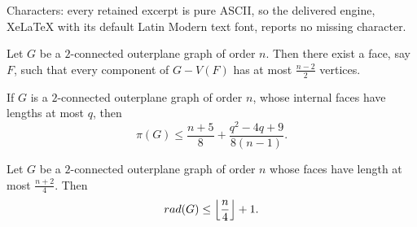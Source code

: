 \documentclass[10pt,a4paper]{amsart}
\begin{document}
Characters: every retained excerpt is pure ASCII, so the delivered engine, XeLaTeX with its default Latin Modern text font, reports no missing character.
\begin{lemma}
\label{lemm:face-component-has-at-most-n-2/2 vertices}
Let $G$ be a $2$-connected outerplane graph of order $n$. Then there exist a face, say $F$, such that every component of $G - V(F)$ has at most $\frac{n-2}{2}$ vertices.
\end{lemma}

\begin{theorem}\label{theo:proximity in 2-connected outerplana graph}
If $G$ is a $2$-connected outerplane graph of order $n$, whose internal faces have lengths at most $q$, then 
\begin{equation*} \label{eq:pi(G) in terms of q,n}
\pi(G) \leq
   \dfrac{n+5}{8}+\dfrac{q^2-4q+9}{8(n-1)}.
\end{equation*}
\end{theorem}

\begin{theorem}\label{theo:rad in Outerpanar}
Let $G$ be a $2$-connected outerplane graph of order $n$ whose faces have length at most 
$\frac{n+2}{4}$. 
Then
\[ {\rm rad}(G) \leq \left\lfloor \frac{n}{4} \right\rfloor + 1. \]
\end{theorem}
\end{document}
